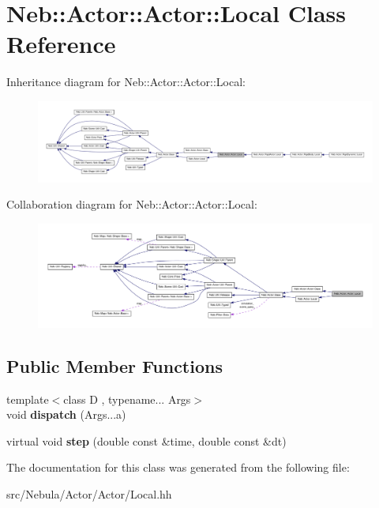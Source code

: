 \hypertarget{classNeb_1_1Actor_1_1Actor_1_1Local}{\section{\-Neb\-:\-:\-Actor\-:\-:\-Actor\-:\-:\-Local \-Class \-Reference}
\label{classNeb_1_1Actor_1_1Actor_1_1Local}
}


\-Inheritance diagram for \-Neb\-:\-:\-Actor\-:\-:\-Actor\-:\-:\-Local\-:\nopagebreak
\begin{figure}[H]
\begin{center}
\leavevmode
\includegraphics[width=350pt]{classNeb_1_1Actor_1_1Actor_1_1Local__inherit__graph}
\end{center}
\end{figure}


\-Collaboration diagram for \-Neb\-:\-:\-Actor\-:\-:\-Actor\-:\-:\-Local\-:\nopagebreak
\begin{figure}[H]
\begin{center}
\leavevmode
\includegraphics[width=350pt]{classNeb_1_1Actor_1_1Actor_1_1Local__coll__graph}
\end{center}
\end{figure}
\subsection*{\-Public \-Member \-Functions}
\begin{DoxyCompactItemize}
\item 
\hypertarget{classNeb_1_1Actor_1_1Actor_1_1Local_a9d90590b0fc839b6e6cfda5c96fefe51}{{\footnotesize template$<$class D , typename... \-Args$>$ }\\void {\bfseries dispatch} (\-Args...\-a)}\label{classNeb_1_1Actor_1_1Actor_1_1Local_a9d90590b0fc839b6e6cfda5c96fefe51}

\item 
\hypertarget{classNeb_1_1Actor_1_1Actor_1_1Local_aa2ed15c6bf086b3a82f361f4c4b8997c}{virtual void {\bfseries step} (double const \&time, double const \&dt)}\label{classNeb_1_1Actor_1_1Actor_1_1Local_aa2ed15c6bf086b3a82f361f4c4b8997c}

\end{DoxyCompactItemize}


\-The documentation for this class was generated from the following file\-:\begin{DoxyCompactItemize}
\item 
src/\-Nebula/\-Actor/\-Actor/\-Local.\-hh\end{DoxyCompactItemize}
